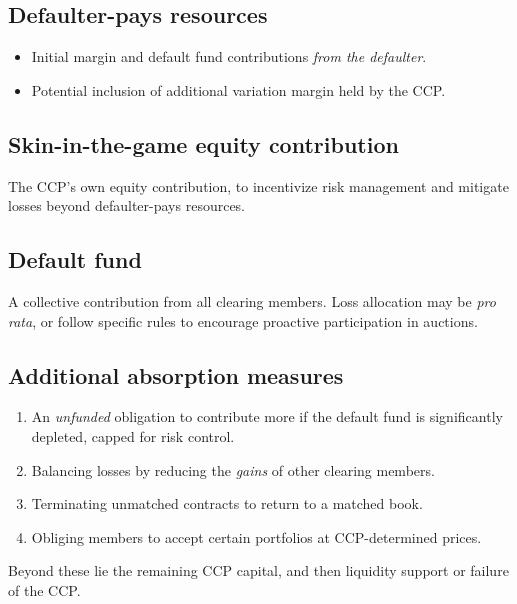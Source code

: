 \subsection*{Defaulter-pays resources}

\begin{itemize}
\item Initial margin and default fund contributions \emph{from the defaulter}.
\item Potential inclusion of additional variation margin held by the CCP.
\end{itemize}

\subsection*{Skin-in-the-game equity contribution}

The CCP's own equity contribution, to incentivize risk management and mitigate
losses beyond defaulter-pays resources.

\subsection*{Default fund}

A collective contribution from all clearing members. Loss allocation may be
\emph{pro rata}, or follow specific rules to encourage proactive participation in
auctions.

\subsection*{Additional absorption measures}

\begin{enumerate}
\item {} An \emph{unfunded} obligation to contribute
more if the default fund is significantly depleted, capped for risk control.
\item {} Balancing losses by
reducing the \emph{gains} of other clearing members.
\item {} Terminating unmatched contracts to return to a matched book.
\item {} Obliging members to accept certain portfolios at
CCP-determined prices.
\end{enumerate}

Beyond these lie the remaining CCP capital, and then liquidity support or failure
of the CCP.

